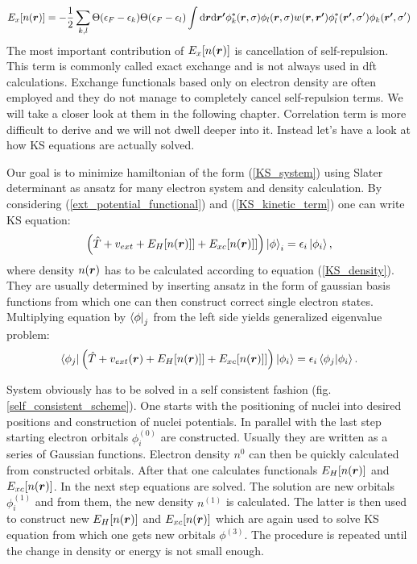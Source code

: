 \documentclass[openany, longbibliography,slovene,a4paper,12pt]{article}
\def\vec#1{\mbox{\boldmath$#1$}}
\newcommand{\dif}{\mathrm{d}}
\begin{document}
\begin{equation}
  E_{x}[n(\vec r)]=-\frac{1}{2}\sum_{k,l}\Theta(\epsilon_F-\epsilon_k)\Theta(\epsilon_F-\epsilon_l)\int \dif \vec{r} \dif \vec{r'}\phi^*_k(\vec r, \sigma)\phi_l(\vec{r}, \sigma)w(\vec{r},\vec{r'})\phi^*_l(\vec{r'}, \sigma')\phi_k(\vec{r'}, \sigma')
\end{equation}
The most important contribution of $E_{x}[n(\vec r)]$ is cancellation of
self-repulsion. This term is commonly called exact exchange and is not always
used in dft calculations. Exchange functionals based only on
electron density are often employed and they do not manage to completely cancel
self-repulsion terms. We will take a closer look at them in the following chapter.
Correlation term is more difficult to derive and we will not dwell deeper into
it. Instead let's have a look at how KS equations are actually solved.

Our goal is to minimize hamiltonian of the form (\ref{KS_system}) using Slater
determinant as ansatz for many electron system and density calculation. By
considering (\ref{ext_potential_functional}) and (\ref{KS_kinetic_term}) one can
write KS equation:  
\begin{equation}
  \left( \hat T + v_{ext} + E_H[n(\vec r)]]  + E_{xc}[n(\vec r)]] \right) \ket \phi_i =  \epsilon_i \ket{\phi_i},  
\end {equation}
where density $n(\vec r)$  has to be calculated according to equation
(\ref{KS_density}). They are usually determined by inserting ansatz in the
form of gaussian basis functions from which one can
then construct correct single electron states. Multiplying equation by $\bra
\phi_j$ from the left side yields generalized eigenvalue problem:
\begin{equation}
  \bra {\phi_j} \left( \hat T + v_{ext}(\vec r) + E_H[n(\vec r)]]  + E_{xc}[n(\vec r)]] \right) \ket{\phi_i} =  \epsilon_i \braket{ \phi_j |\phi_i }.
\end {equation}

System obviously has to be solved in a self consistent fashion
(fig. \ref{self_consistent_scheme}). One starts with the positioning of nuclei into
desired positions and construction of nuclei potentials. In parallel with the
last step starting electron orbitals $\phi^{(0)}_i$ are constructed. Usually they are written
as a series of Gaussian functions. Electron density $n^0$ can then be quickly
calculated from constructed orbitals. After that one
calculates functionals $E_H[n(\vec r)]$ and $E_{xc}[n(\vec r)]$. In the next step
equations are solved. The solution are new orbitals $\phi_i^{(1)}$  and from
them, the new density $n^{(1)}$ is calculated. The latter is then used to construct new $E_H[n(\vec r)]$ and $E_{xc}[n(\vec r)]$ which are again used to
solve KS equation from which one gets new orbitals $\phi^{(3)}$. The procedure is
repeated until the change in density or energy is not small enough. 
\end{document}
